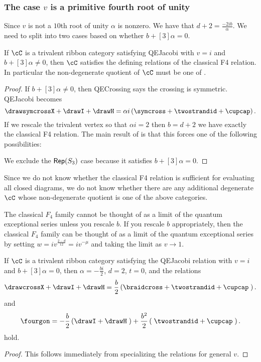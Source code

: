 \documentclass[12pt]{amsart}
\begin{document}
\subsubsection{The case \texorpdfstring{$v$}{v} is a primitive fourth root of unity}

Since $v$ is not a $10$th root of unity $\alpha$ is nonzero.  We have that $d+2 = \frac{-2ib}{\alpha}$.
We need to split into two cases based on whether $b+[3]\alpha = 0$.  

\begin{proposition}
If $\cC$ is a trivalent ribbon category satisfying QEJacobi with $v = i$ and $b+[3]\alpha \neq 0$, then $\cC$ satisfies the defining relations of the classical F4 relation.  In particular the non-degenerate quotient of $\cC$ must be one of .
\end{proposition}
\begin{proof}
If $b+[3]\alpha \neq 0$, then QECrossing says the crossing is symmetric.   QEJacobi becomes
$$\drawsymcrossX + \drawI + \drawH = \alpha i \left(\symcross + \twostrandid + \cupcap \right).$$  If we rescale the trivalent vertex so that $\alpha i = 2$ then $b = d+2$ we have exactly the classical F4 relation.  The main result of \cite{F4E6} is that this forces one of the following possibilities:


We exclude the $\operatorname{\mathsf{Rep}}(S_3)$ case because it satisfies $b+[3]\alpha = 0$.
\end{proof}

Since we do not know whether the classical F4 relation is sufficient for evaluating all closed diagrams, we do not know whether there are any additional degenerate $\cC$ whose non-degenerate quotient is one of the above categories.

\begin{remark}
The classical $F_4$ family cannot be thought of as a limit of the quantum exceptional series unless you rescale $b$.  If you rescale $b$ appropriately, then the classical $F_4$ family can be thought of as a limit of the quantum exceptional series by setting $w = i v^{\frac{2-d}{12}} = i v^{-\mu}$ and taking the limit as $v \rightarrow 1$.
\end{remark}


\begin{lemma}
If $\cC$ is a trivalent ribbon category satisfying the QEJacobi relation with $v=i$ and $b+[3]\alpha = 0$, then $\alpha = -\frac{bi}{2}$, $d = 2$, $t=0$, and the relations
$$\drawcrossX + \drawI + \drawH = \frac{b}{2} \left(\braidcross + \twostrandid + \cupcap \;\right).$$
and 
$$\fourgon = -\frac{b}{2} \left(\drawI + \drawH \;\right) + \frac{b^2}{2} \left(\;\twostrandid + \cupcap \;\right).$$ hold.
\end{lemma}
\begin{proof}
This follows immediately from specializing the relations for general $v$.
\end{proof}
\end{document}
